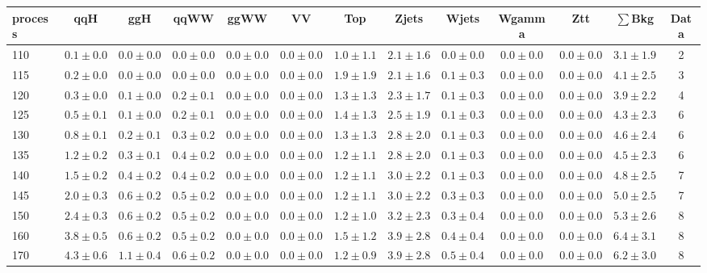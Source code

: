 \begin{table}
{%
 \tiny
 \begin{center}
 \begin{tabular}{l | c c | c c c c c c c c  | c c}
 \hline
 process & qqH & ggH & qqWW & ggWW & VV & Top & Zjets & Wjets & Wgamma & Ztt & $\sum$Bkg & Data \\
 \hline
110 & $0.1\pm0.0$ & $0.0\pm0.0$ & $0.0\pm0.0$ & $0.0\pm0.0$ & $0.0\pm0.0$ & $1.0\pm1.1$ & $2.1\pm1.6$ & $0.0\pm0.0$ & $0.0\pm0.0$ & $0.0\pm0.0$ & $3.1\pm1.9$ & 2 \\
115 & $0.2\pm0.0$ & $0.0\pm0.0$ & $0.0\pm0.0$ & $0.0\pm0.0$ & $0.0\pm0.0$ & $1.9\pm1.9$ & $2.1\pm1.6$ & $0.1\pm0.3$ & $0.0\pm0.0$ & $0.0\pm0.0$ & $4.1\pm2.5$ & 3 \\
120 & $0.3\pm0.0$ & $0.1\pm0.0$ & $0.2\pm0.1$ & $0.0\pm0.0$ & $0.0\pm0.0$ & $1.3\pm1.3$ & $2.3\pm1.7$ & $0.1\pm0.3$ & $0.0\pm0.0$ & $0.0\pm0.0$ & $3.9\pm2.2$ & 4 \\
125 & $0.5\pm0.1$ & $0.1\pm0.0$ & $0.2\pm0.1$ & $0.0\pm0.0$ & $0.0\pm0.0$ & $1.4\pm1.3$ & $2.5\pm1.9$ & $0.1\pm0.3$ & $0.0\pm0.0$ & $0.0\pm0.0$ & $4.3\pm2.3$ & 6 \\
130 & $0.8\pm0.1$ & $0.2\pm0.1$ & $0.3\pm0.2$ & $0.0\pm0.0$ & $0.0\pm0.0$ & $1.3\pm1.3$ & $2.8\pm2.0$ & $0.1\pm0.3$ & $0.0\pm0.0$ & $0.0\pm0.0$ & $4.6\pm2.4$ & 6 \\
135 & $1.2\pm0.2$ & $0.3\pm0.1$ & $0.4\pm0.2$ & $0.0\pm0.0$ & $0.0\pm0.0$ & $1.2\pm1.1$ & $2.8\pm2.0$ & $0.1\pm0.3$ & $0.0\pm0.0$ & $0.0\pm0.0$ & $4.5\pm2.3$ & 6 \\
140 & $1.5\pm0.2$ & $0.4\pm0.2$ & $0.4\pm0.2$ & $0.0\pm0.0$ & $0.0\pm0.0$ & $1.2\pm1.1$ & $3.0\pm2.2$ & $0.1\pm0.3$ & $0.0\pm0.0$ & $0.0\pm0.0$ & $4.8\pm2.5$ & 7 \\
145 & $2.0\pm0.3$ & $0.6\pm0.2$ & $0.5\pm0.2$ & $0.0\pm0.0$ & $0.0\pm0.0$ & $1.2\pm1.1$ & $3.0\pm2.2$ & $0.3\pm0.3$ & $0.0\pm0.0$ & $0.0\pm0.0$ & $5.0\pm2.5$ & 7 \\
150 & $2.4\pm0.3$ & $0.6\pm0.2$ & $0.5\pm0.2$ & $0.0\pm0.0$ & $0.0\pm0.0$ & $1.2\pm1.0$ & $3.2\pm2.3$ & $0.3\pm0.4$ & $0.0\pm0.0$ & $0.0\pm0.0$ & $5.3\pm2.6$ & 8 \\
160 & $3.8\pm0.5$ & $0.6\pm0.2$ & $0.5\pm0.2$ & $0.0\pm0.0$ & $0.0\pm0.0$ & $1.5\pm1.2$ & $3.9\pm2.8$ & $0.4\pm0.4$ & $0.0\pm0.0$ & $0.0\pm0.0$ & $6.4\pm3.1$ & 8 \\
170 & $4.3\pm0.6$ & $1.1\pm0.4$ & $0.6\pm0.2$ & $0.0\pm0.0$ & $0.0\pm0.0$ & $1.2\pm0.9$ & $3.9\pm2.8$ & $0.5\pm0.4$ & $0.0\pm0.0$ & $0.0\pm0.0$ & $6.2\pm3.0$ & 8 \\

\end{tabular}
\end{center}}
\end{table}
